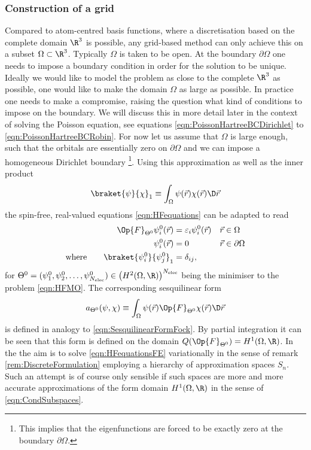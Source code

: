 \subsubsection{Construction of a \FE grid}
Compared to atom-centred basis functions,
where a discretisation based on the complete domain $\R^3$ is possible,
any grid-based method can only achieve this
on a subset $\Omega \subset \R^3$.
Typically $\Omega$ is taken to be open.
At the boundary $\partial\Omega$ one needs
to impose a boundary condition in order for the solution to be unique.
Ideally we would like to model the problem as close to the complete $\R^3$
as possible, \ie one would like to make the domain $\Omega$ as large as possible.
In practice one needs to make a compromise,
raising the question what kind of conditions to impose on the boundary.
We will discuss this in more detail later in the context
of solving the Poisson equation,
see equations \eqref{eqn:PoissonHartreeBCDirichlet} to \eqref{eqn:PoissonHartreeBCRobin}.
For now let us assume that $\Omega$ is large enough,
such that the \SCF orbitals are essentially zero on $\partial\Omega$
and we can impose a homogeneous Dirichlet boundary%
\footnote{This implies that the \HF eigenfunctions are forced
	to be exactly zero at the boundary $\partial\Omega$.}.
Using this approximation as well as the inner product
\[ \braket{\psi}{\chi}_1 \equiv \int_\Omega \psi(\vec{r}) \chi(\vec{r})  \D \vec{r} \]
the spin-free, real-valued \HF equations \eqref{eqn:HFequations} can be adapted to read
%
\begin{equation}
\label{eqn:HFequationsFE}
\begin{aligned}
	\Op{F}_{\Theta^0} \psi_i^0(\vec{r}) &= \varepsilon_i \psi_i^0(\vec{r}) && \vec{r} \in \Omega \\
	\psi_i^0(\vec{r}) &=0 &&\vec{r} \in \partial \Omega \\
	\text{where}\qquad \braket{\psi_i^0}{\psi_j^0}_1 &= \delta_{ij},
\end{aligned}
\end{equation}
for $\Theta^0 = (\psi_1^0, \psi_2^0, \ldots, \psi_{\Nelec}^0) \in \left( H^2(\Omega,\R) \right)^{\Nelec}$
being the minimiser to the \HF problem \eqref{eqn:HFMO}.
The corresponding sesquilinear form
\[ a_{\Theta^0}(\psi, \chi)
	\equiv \int_\Omega \psi(\vec{r}) \Op{F}_{\Theta^0} \chi(\vec{r}) \D \vec{r} \]
is defined in analogy to \eqref{eqn:SesquilinearFormFock}.
By partial integration it can be seen that this form
is defined on the domain $Q(\Op{F}_{\Theta^0}) = H^1(\Omega, \R)$.
In the 
the aim is to solve \eqref{eqn:HFequationsFE} variationally
in the sense of remark \vref{rem:DiscreteFormulation}
employing a hierarchy of approximation spaces $S_n$.
Such an attempt is of course only sensible
if such spaces are more and more accurate
approximations of the form domain $H^1(\Omega, \R)$
in the sense of \eqref{eqn:CondSubspaces}.

